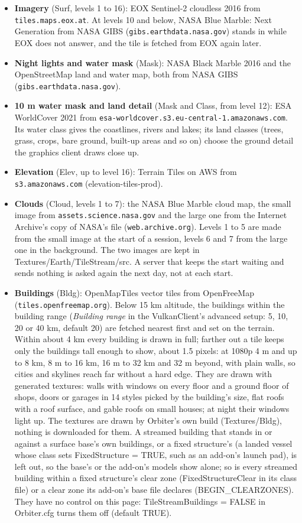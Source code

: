 \documentclass[Orbiter User Manual.tex]{subfiles}
\begin{document}
\begin{itemize}
\item \textbf{Imagery} (Surf, levels 1 to 16): EOX Sentinel-2 cloudless 2016 from \texttt{tiles.maps.eox.at}. At levels 10 and below, NASA Blue Marble: Next Generation from NASA GIBS (\texttt{gibs.earthdata.nasa.gov}) stands in while EOX does not answer, and the tile is fetched from EOX again later.
\item \textbf{Night lights and water mask} (Mask): NASA Black Marble 2016 and the OpenStreetMap land and water map, both from NASA GIBS (\texttt{gibs.earthdata.nasa.gov}).
\item \textbf{10 m water mask and land detail} (Mask and Class, from level 12): ESA WorldCover 2021 from \texttt{esa-worldcover.s3.eu-central-1.amazonaws.com}. Its water class gives the coastlines, rivers and lakes; its land classes (trees, grass, crops, bare ground, built-up areas and so on) choose the ground detail the graphics client draws close up.
\item \textbf{Elevation} (Elev, up to level 16): Terrain Tiles on AWS from \texttt{s3.amazonaws.com} (elevation-tiles-prod).
\item \textbf{Clouds} (Cloud, levels 1 to 7): the NASA Blue Marble cloud map, the small image from \texttt{assets.science.nasa.gov} and the large one from the Internet Archive's copy of NASA's file (\texttt{web.archive.org}). Levels 1 to 5 are made from the small image at the start of a session, levels 6 and 7 from the large one in the background. The two images are kept in Textures/Earth/TileStream/src. A server that keeps the start waiting and sends nothing is asked again the next day, not at each start.
\item \textbf{Buildings} (Bldg): OpenMapTiles vector tiles from OpenFreeMap (\texttt{tiles.openfreemap.org}). Below 15 km altitude, the buildings within the building range (\textit{Building range} in the VulkanClient's advanced setup: 5, 10, 20 or 40 km, default 20) are fetched nearest first and set on the terrain. Within about 4 km every building is drawn in full; farther out a tile keeps only the buildings tall enough to show, about 1.5 pixels: at 1080p 4 m and up to 8 km, 8 m to 16 km, 16 m to 32 km and 32 m beyond, with plain walls, so cities and skylines reach far without a hard edge. They are drawn with generated textures: walls with windows on every floor and a ground floor of shops, doors or garages in 14 styles picked by the building's size, flat roofs with a roof surface, and gable roofs on small houses; at night their windows light up. The textures are drawn by Orbiter's own build (Textures/Bldg), nothing is downloaded for them. A streamed building that stands in or against a surface base's own buildings, or a fixed structure's (a landed vessel whose class sets FixedStructure = TRUE, such as an add-on's launch pad), is left out, so the base's or the add-on's models show alone; so is every streamed building within a fixed structure's clear zone (FixedStructureClear in its class file) or a clear zone its add-on's base file declares (BEGIN\_CLEARZONES). They have no control on this page: TileStreamBuildings = FALSE in Orbiter.cfg turns them off (default TRUE).

\end{itemize}
\end{document}
